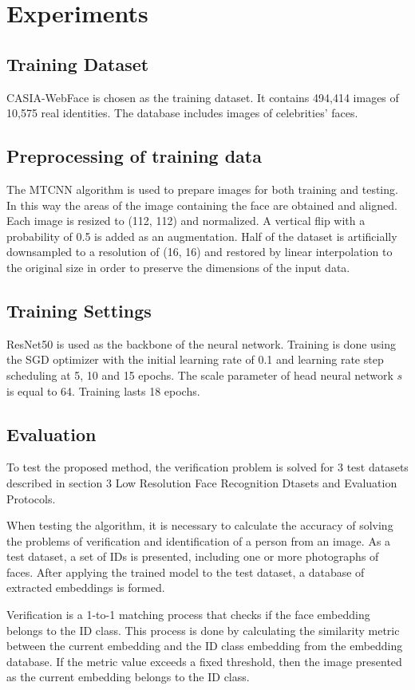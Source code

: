 \documentclass[11pt,a4paper]{article}
\begin{document}
\section{Experiments}
\subsection{Training Dataset}
CASIA-WebFace \cite{webface} is chosen as the training dataset. It contains 494,414 images of 10,575 real identities. The database includes images of celebrities' faces.
\subsection{Preprocessing of training data}
The MTCNN \cite{2} algorithm is used to prepare images for both training and testing. In this way the areas of the image containing the face are obtained and aligned. Each image is resized to (112, 112) and normalized. A vertical flip with a probability of 0.5 is added as an augmentation. Half of the dataset is artificially downsampled to a resolution of (16, 16) and restored by linear interpolation to the original size in order to preserve the dimensions of the input data.
\subsection{Training Settings}
ResNet50 is used as the backbone of the neural network. Training is done using the SGD optimizer with the initial learning rate of 0.1 and learning rate step scheduling at 5, 10 and 15 epochs. The scale parameter of head neural network $s$  is equal to 64. Training lasts 18 epochs.
\subsection{Evaluation} 
To test the proposed method, the verification problem is solved for 3 test datasets described in section 3 Low Resolution Face Recognition Dtasets and Evaluation Protocols.

When testing the algorithm, it is necessary to calculate the accuracy of solving the problems of verification and identification of a person from an image. As a test dataset, a set of IDs is presented, including one or more photographs of faces. After applying the trained model to the test dataset, a database of extracted embeddings is formed.

Verification is a 1-to-1 matching process that checks if the face embedding belongs to the ID class. This process is done by calculating the similarity metric between the current embedding and the ID class embedding from the embedding database. If the metric value exceeds a fixed threshold, then the image presented as the current embedding belongs to the ID class.
\end{document}

